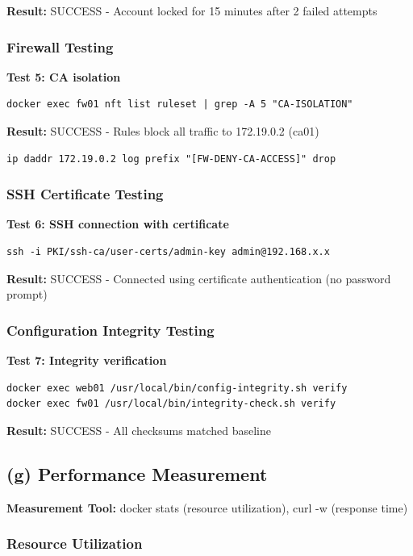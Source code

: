 \textbf{Result:} SUCCESS - Account locked for 15 minutes after 2 failed attempts

\subsubsection{Firewall Testing}

\textbf{Test 5: CA isolation}
\begin{verbatim}
docker exec fw01 nft list ruleset | grep -A 5 "CA-ISOLATION"
\end{verbatim}

\textbf{Result:} SUCCESS - Rules block all traffic to 172.19.0.2 (ca01)
\begin{verbatim}
ip daddr 172.19.0.2 log prefix "[FW-DENY-CA-ACCESS]" drop
\end{verbatim}

\subsubsection{SSH Certificate Testing}

\textbf{Test 6: SSH connection with certificate}
\begin{verbatim}
ssh -i PKI/ssh-ca/user-certs/admin-key admin@192.168.x.x
\end{verbatim}

\textbf{Result:} SUCCESS - Connected using certificate authentication (no password prompt)

\subsubsection{Configuration Integrity Testing}

\textbf{Test 7: Integrity verification}
\begin{verbatim}
docker exec web01 /usr/local/bin/config-integrity.sh verify
docker exec fw01 /usr/local/bin/integrity-check.sh verify
\end{verbatim}

\textbf{Result:} SUCCESS - All checksums matched baseline

\subsection{(g) Performance Measurement}

\textbf{Measurement Tool:} docker stats (resource utilization), curl -w (response time)

\subsubsection{Resource Utilization}

